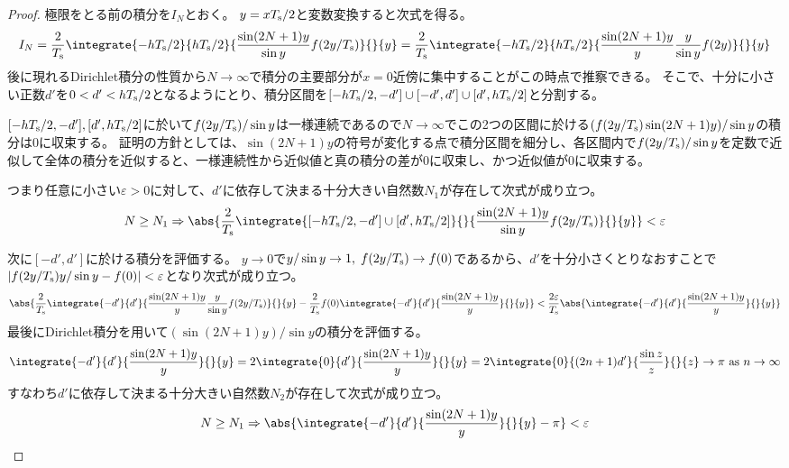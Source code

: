         \begin{proof}
            \quad\par
            極限をとる前の積分を$I_N$とおく。
            $y = x T_\text{s}/2$と変数変換すると次式を得る。
            \[
                I_N = \frac{2}{\Ts}\integrate{-h \Ts/2}{h \Ts/2}{\frac{\sin(2N+1)y}{\sin y}f(2y/\Ts)}{}{y} = \frac{2}{\Ts}\integrate{-h \Ts/2}{h \Ts/2}{\frac{\sin(2N+1)y}{y}\frac{y}{\sin y}f(2y)}{}{y}
            \]
            後に現れるDirichlet積分の性質から$N\to\infty$で積分の主要部分が$x=0$近傍に集中することがこの時点で推察できる。
            そこで、十分に小さい正数$d'$を$0<d'<h T_\text{s}/2$となるようにとり、積分区間を$[-h T_\text{s}/2,-d']\cup[-d',d']\cup[d',h T_\text{s}/2]$と分割する。
            \par
            $[-h T_\text{s}/2,-d'], [d',h T_\text{s}/2]$に於いて$f(2y/T_\text{s})/\sin y$は一様連続であるので$N\to\infty$でこの2つの区間に於ける$(f(2y/T_\text{s})\sin(2N+1)y)/\sin y$の積分は0に収束する。
            証明の方針としては、$\sin(2N+1)y$の符号が変化する点で積分区間を細分し、各区間内で$f(2y/T_\text{s})/\sin y$を定数で近似して全体の積分を近似すると、一様連続性から近似値と真の積分の差が0に収束し、かつ近似値が0に収束する。
            \par
            つまり任意に小さい$\varepsilon>0$に対して、$d'$に依存して決まる十分大きい自然数$N_1$が存在して次式が成り立つ。
            \[
                N\geq N_1 \Rightarrow \abs{\frac{2}{\Ts}\integrate{[-h \Ts/2,-d']\cup[d',h \Ts/2]}{}{\frac{\sin(2N+1)y}{\sin y}f(2y/\Ts)}{}{y}}<\varepsilon
            \]
            \par
            次に$[-d',d']$に於ける積分を評価する。
            $y\to 0$で$y/\sin y\to 1,\;f(2y/T_\text{s})\to f(0)$であるから、$d'$を十分小さくとりなおすことで$|f(2y/T_\text{s})y/\sin y - f(0)| < \varepsilon$となり次式が成り立つ。
            \[
                \abs{\frac{2}{\Ts}\integrate{-d'}{d'}{\frac{\sin(2N+1)y}{y}\frac{y}{\sin y}f(2y/\Ts)}{}{y} - \frac{2}{\Ts}f(0)\integrate{-d'}{d'}{\frac{\sin(2N+1)y}{y}}{}{y}} < \frac{2\varepsilon}{\Ts}\abs{\integrate{-d'}{d'}{\frac{\sin(2N+1)y}{y}}{}{y}}
            \]
            最後にDirichlet積分を用いて$(\sin(2N+1)y)/\sin y$の積分を評価する。
            \[
                \integrate{-d'}{d'}{\frac{\sin(2N+1)y}{y}}{}{y} = 2\integrate{0}{d'}{\frac{\sin(2N+1)y}{y}}{}{y} = 2\integrate{0}{(2n+1)d'}{\frac{\sin z}{z}}{}{z} \to \pi \text{ as } n\to\infty
            \]
            すなわち$d'$に依存して決まる十分大きい自然数$N_2$が存在して次式が成り立つ。
            \[ N\geq N_1 \Rightarrow \abs{\integrate{-d'}{d'}{\frac{\sin(2N+1)y}{y}}{}{y} - \pi} < \varepsilon \]

\end{proof}
